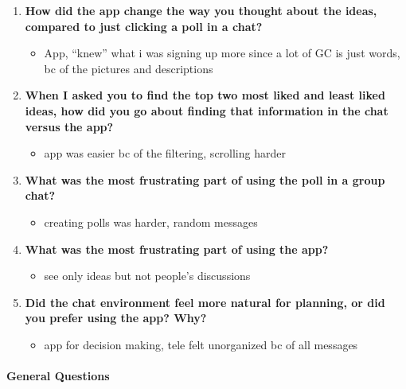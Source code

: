 \documentclass[12pt,a4paper]{article}
\begin{document}
\begin{enumerate}
    \item \textbf{How did the app change the way you thought about the ideas, compared to just clicking a poll in a chat?}
    
    \begin{itemize}
        \item App, ``knew'' what i was signing up more since a lot of GC is just words, bc of the pictures and descriptions
    \end{itemize}
    
    \item \textbf{When I asked you to find the top two most liked and least liked ideas, how did you go about finding that information in the chat versus the app?}
    
    \begin{itemize}
        \item app was easier bc of the filtering, scrolling harder
    \end{itemize}
    
    \item \textbf{What was the most frustrating part of using the poll in a group chat?}
    
    \begin{itemize}
        \item creating polls was harder, random messages
    \end{itemize}
    
    \item \textbf{What was the most frustrating part of using the app?}
    
    \begin{itemize}
        \item see only ideas but not people's discussions
    \end{itemize}
    
    \item \textbf{Did the chat environment feel more natural for planning, or did you prefer using the app? Why?}
    
    \begin{itemize}
        \item app for decision making, tele felt unorganized bc of all messages
    \end{itemize}
\end{enumerate}

\paragraph{General Questions}
\end{document}

